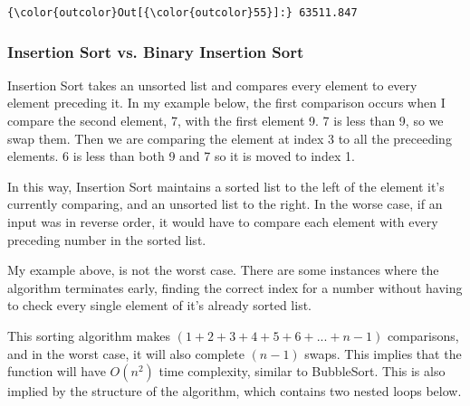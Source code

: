 \documentclass[11pt]{article}
\begin{document}
\begin{Verbatim}[commandchars=\\\{\}]
{\color{outcolor}Out[{\color{outcolor}55}]:} 63511.847
\end{Verbatim}
            
    \subsubsection{Insertion Sort vs. Binary Insertion
Sort}\label{insertion-sort-vs.-binary-insertion-sort}

    Insertion Sort takes an unsorted list and compares every element to
every element preceding it. In my example below, the first comparison
occurs when I compare the second element, 7, with the first element 9. 7
is less than 9, so we swap them. Then we are comparing the element at
index 3 to all the preceeding elements. 6 is less than both 9 and 7 so
it is moved to index 1.

    

    In this way, Insertion Sort maintains a sorted list to the left of the
element it's currently comparing, and an unsorted list to the right. In
the worse case, if an input was in reverse order, it would have to
compare each element with every preceding number in the sorted list.

My example above, is not the worst case. There are some instances where
the algorithm terminates early, finding the correct index for a number
without having to check every single element of it's already sorted
list.

    This sorting algorithm makes \((1 + 2 + 3 + 4 + 5 + 6 + ... + n-1)\)
comparisons, and in the worst case, it will also complete \((n-1)\)
swaps. This implies that the function will have \(O(n^2)\) time
complexity, similar to BubbleSort. This is also implied by the structure
of the algorithm, which contains two nested loops below.
\end{document}

